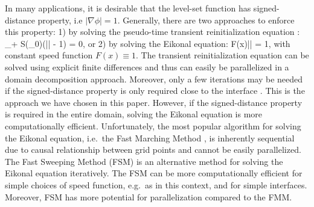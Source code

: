 In many applications, it is desirable that the level-set function has signed-distance property, i.e $|\nabla \phi| = 1$. Generally, there are two approaches to enforce this property: 1) by solving the pseudo-time transient reinitialization equation \cite{Sussman;Smereka;Osher:94:A-Level-Set-Approach, Osher;Fedkiw:01:Level-Set-Methods:-A}:
\ben
\phi_\tau + S(\phi_0)\left(|\nabla \phi| - 1\right) = 0,
\een
or 2) by solving the Eikonal equation:
\ben
F(x)|\nabla\phi| = 1,
\een 
with constant speed function $F(x) \equiv 1$. The transient reinitialization equation can be solved using explicit finite differences and thus can easily be parallelized in a domain decomposition approach. Moreover, only a few iterations may be needed if the signed-distance property is only required close to the interface \cite{Min;Gibou:07:A-second-order-accur}. This is the approach we have chosen in this paper. However, if the signed-distance property is required in the entire domain, solving the Eikonal equation is more computationally efficient. Unfortunately, the most popular algorithm for solving the Eikonal equation, i.e.\ the Fast Marching Method \cite{Sethian:96:A-Fast-Marching-Leve,Sethian:99:Level-set-methods-an}, is inherently sequential due to causal relationship between grid points and cannot be easily parallelized. The Fast Sweeping Method (FSM) \cite{Zhao:05:A-fast-sweeping-meth} is an alternative method for solving the Eikonal equation iteratively. The FSM can be more computationally efficient for simple choices of speed function, e.g.\ as in this context, and for simple interfaces. Moreover, FSM has more potential for parallelization compared to the FMM.

